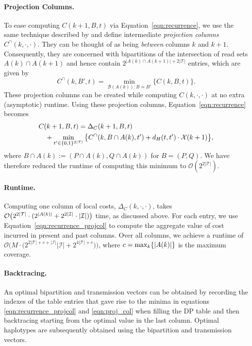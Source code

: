 \paragraph{Projection Columns.}
To ease computing $C(k+1,B,t)$ via Equation~\eqref{eqn:recurrence}, we use the same technique described by \cite{Patterson2015} and define intermediate \emph{projection columns} $C^\cap(k,\cdot,\cdot)$.
They can be thought of as being \emph{between} columns $k$ and $k+1$.
Consequently, they are concerned with bipartitions of the intersection of read sets $A(k)\cap A(k+1)$ and hence contain $2^{|A(k)\cap A(k+1)|+2|\mathcal{T}|}$ entries, which are given by
\begin{equation}\label{eqn:proj_col}
C^\cap(k,B',t)=\min_{\mathcal{B}(A(k)):B\simeq B'}\{C(k,B,t)\}.
\end{equation}
These projection columns can be created while computing $C(k,\cdot,\cdot)$ at no extra (asymptotic) runtime.
Using these projection columns, Equation~\eqref{eqn:recurrence} becomes
\begin{align}\label{eqn:recurrence_projcol}
& C(k+1,B,t)= \Delta_C(k+1,B,t)\\
& \quad + \min_{t'\in\{0,1\}^{2{\left\lvert \mathcal{T} \right\rvert}}}\big\{C^\cap(k,B\cap A(k),t')+d_H(t,t')\cdot\mathcal{X}(k+1)\big\}, \nonumber
\end{align}
where $B\cap A(k) := (P\cap A(k), Q\cap A(k))$ for $B=(P,Q)$.
We have therefore reduced the runtime of computing this minimum to $\mathcal{O}(2^{2|\mathcal{T}|})$.

\paragraph{Runtime.}
Computing one column of local costs, $\Delta_C(k,\cdot,\cdot)$, takes $\mathcal{O}\big(2^{2{\left\lvert \mathcal{T} \right\rvert}}\cdot(2^{|A(k)|} +  2^{2|\mathcal{I}|}\cdot |\mathcal{I}|)\big)$ time, as discussed above.
For each entry, we use Equation~\eqref{eqn:recurrence_projcol} to compute the aggregate value of cost incurred in present and past columns.
Over all columns, we achieve a runtime of 
$\mathcal{O}\big(M\cdot \big(2^{2|\mathcal{T}|+c+|\mathcal{I}|}|\mathcal{I}|+2^{4|\mathcal{T}|+c}\big)\big)$, where $c=\max_k\{{\left\lvert A(k) \right\rvert}\}$ is the maximum coverage.

\paragraph{Backtracing.}
An optimal bipartition and transmission vectors can be obtained by recording the indexes of the table entries that gave rise to the minima in equations \eqref{eqn:recurrence_projcol} and \eqref{eqn:proj_col} when filling the DP table and then backtracing starting from the optimal value in the last column.
Optimal haplotypes are subsequently obtained using the bipartition and transmission vectors.



